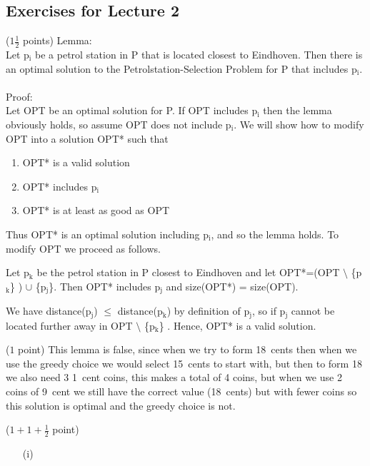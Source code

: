 \documentclass{article}
\renewcommand{\leq}{\leqslant}
\newcounter{rcounter}
\newenvironment{rlist}%
{\begin{list}{A.1-\arabic{rcounter}}{\usecounter{rcounter}}}{\end{list}}
\newcounter{rcountermem}
\begin{document}
\subsection*{Exercises for Lecture 2}
\begin{rlist}
\setcounter{rcounter}{\value{rcountermem}}
\item ($1\frac{1}{2}$ points)
Lemma: \\ Let p$_{\text{i}}$ be a petrol station in P that is located closest to Eindhoven. Then there is an optimal solution to the Petrolstation-Selection Problem for P that includes p$_{\text{i}}$.
\\ \\
Proof: \\
Let OPT be an optimal solution for P. If OPT includes p$_{\text{i}}$ then the lemma obviously holds, so assume OPT does not include p$_{\text{i}}$. 
We will show how to modify OPT into a solution OPT* such that 
\begin{enumerate}
\item{OPT* is a valid solution}
\item{OPT* includes p$_{\text{i}}$}
\item{OPT* is at least as good as OPT}
\end{enumerate}
Thus OPT* is an optimal solution including p$_{\text{i}}$, and so the lemma holds. To modify OPT we proceed as follows. 

Let p$_{\text{k}}$ be the petrol station in P closest to Eindhoven and let OPT*=(OPT $\setminus$ \{p$_{\text{k}}$\} ) $\cup$ \{p$_{\text{j}}$\}. Then OPT* includes p$_{\text{j}}$ and size(OPT*) = size(OPT).

We have distance(p$_{\text{j}}$) $\leq$ distance(p$_{\text{k}}$) by definition of p$_{\text{j}}$, so if p$_{\text{j}}$ cannot be located further away in OPT $\setminus$ \{p$_{\text{k}}$\} . Hence, OPT* is a valid solution.

\item ($1$ point)
	This lemma is false, since when we try to form 18~cents then when we use the greedy choice we would select 15~cents to start with, but then to form 18 we also need 3 1~cent coins, this makes a total of 4 coins, but when we use 2 coins of 9~cent we still have the correct value (18~cents) but with fewer coins so this solution is optimal and the greedy choice is not.

\item ($1+1+\frac{1}{2}$ point)

      \begin{itemize}
      \item[(i)]


\end{itemize}
\end{rlist}
\end{document}
